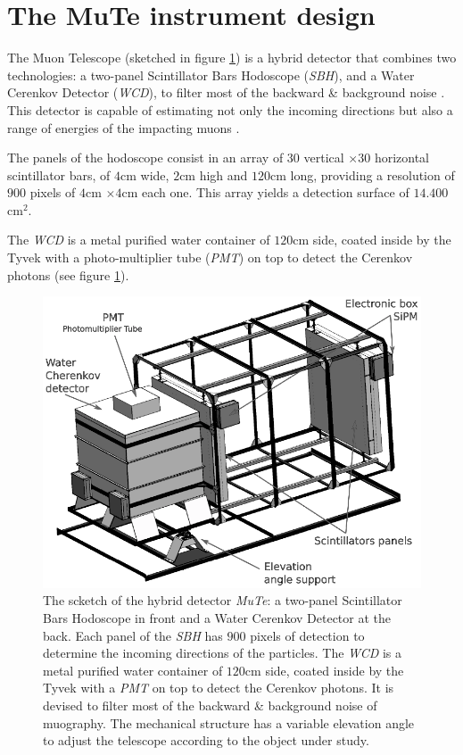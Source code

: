 \documentclass[submitting]{nst}
\begin{document}
\section{The MuTe instrument design}
The Muon Telescope (sketched in figure \ref{fig:mute-detector}) is a hybrid detector that combines two technologies: a two-panel Scintillator Bars Hodoscope (\textsl{SBH}), and a Water Cerenkov Detector (\textsl{WCD}), to filter most of the backward \& background noise \cite{NishiyamaMiyamotoNaganawa2014, KusagayaTanaka2015, NishiyamaEtal2016, GomezEtal2017}. This detector is capable of estimating not only the incoming  directions but also a range of energies of the impacting muons \cite{AsoreyEtal2017B, PenarodriguezEtal2019}.
  
 The panels of the hodoscope consist in an array of $30$ vertical $\times 30$ horizontal scintillator bars, of $4$cm wide, $2$cm high and $120$cm long, providing a resolution of $900$ pixels of $4$cm $\times 4$cm each one. This array yields a detection surface of $14.400$cm$^2$. 
 
 The \textsl{WCD} is a metal purified water container of $120$cm side, coated inside by the Tyvek with a photo-multiplier tube (\textsl{PMT}) on top to detect the Cerenkov photons (see figure \ref{fig:mute-detector}).

\begin{figure}
    \centering
    \includegraphics[scale=0.3]{Figures/mute-detector.png}
    \caption{The scketch of the hybrid detector \textsl{MuTe}: a two-panel Scintillator Bars Hodoscope in front and a Water Cerenkov Detector at the back. Each panel of the \textsl{SBH} has $900$ pixels of detection to determine the incoming directions of the particles. The \textsl{WCD} is a metal purified water container of $120$cm side, coated inside by the Tyvek with a \textsl{PMT} on top to detect the Cerenkov photons. It is devised to filter most of the backward \& background noise of muography. The mechanical structure has a variable elevation angle to adjust the telescope according to the object under study.} 
    \label{fig:mute-detector}
\end{figure}
\end{document}
